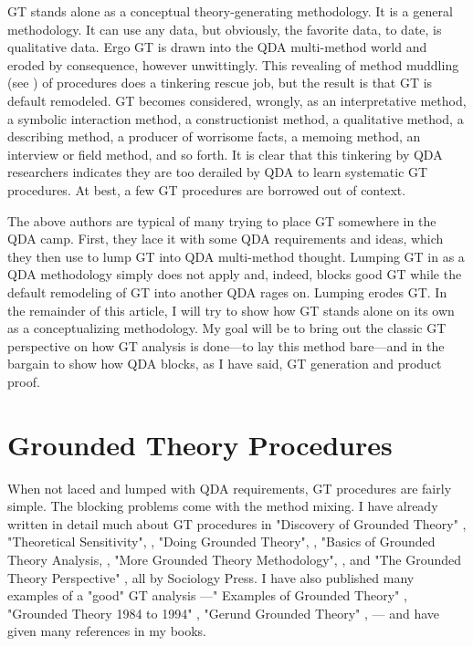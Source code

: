 GT stands alone as a conceptual theory-generating methodology. 
It is a general methodology. 
It can use any data, but obviously, the favorite data, to date, is qualitative data. 
Ergo GT is drawn into the QDA multi-method world and eroded by consequence, however unwittingly. 
This revealing of method muddling
(see \citep{article.cynthia92})
of procedures does a tinkering rescue job, but the result is that GT is default remodeled. 
GT becomes considered, wrongly, as an interpretative method, a symbolic interaction method, a constructionist method, a qualitative method, a describing method, a producer of worrisome facts, a memoing method, an interview or field method, and so forth. 
It is clear that this tinkering by QDA researchers indicates they are too derailed by QDA to learn systematic GT procedures. 
At best, a few GT procedures are borrowed out of context.

The above authors are typical of many trying to place GT somewhere in the QDA camp. 
First, they lace it with some QDA requirements and ideas, which
they then use to lump GT into QDA multi-method thought. 
Lumping GT in as a QDA methodology simply does not apply and, indeed, blocks good GT while the default remodeling of GT into another QDA rages on. 
Lumping erodes GT. 
In the remainder of this article, I will try to show how GT stands alone on its own as a conceptualizing methodology. 
My goal will be to bring out the classic GT perspective on how GT analysis is done—to lay this method bare—and in the bargain to show how QDA blocks, as I have said, GT generation and product proof.

\section*{Grounded Theory Procedures}

When not laced and lumped with QDA requirements, GT procedures are fairly simple. 
The blocking problems come with the method mixing. 
I have already written in detail much about GT procedures in "Discovery of Grounded Theory"
\citep{book.glaser67},
"Theoretical Sensitivity", 
\citep{book.glaser78},
"Doing Grounded Theory", 
\citep{book.glaser98a},
"Basics of Grounded Theory Analysis, 
\citep{book.glaser92},
"More Grounded Theory Methodology", 
\citep{book.glaser94},
and 
"The Grounded Theory Perspective" 
\citep{book.glaser01},
 all by Sociology Press. 
I have also published many examples of a "good" GT analysis
---" Examples of Grounded Theory"
\citep{book.glaser93},
"Grounded Theory 1984 to 1994"
\citep{book.glaser95},
"Gerund Grounded Theory"
\citep{book.glaser98b},
--- and have given many references in my books.

